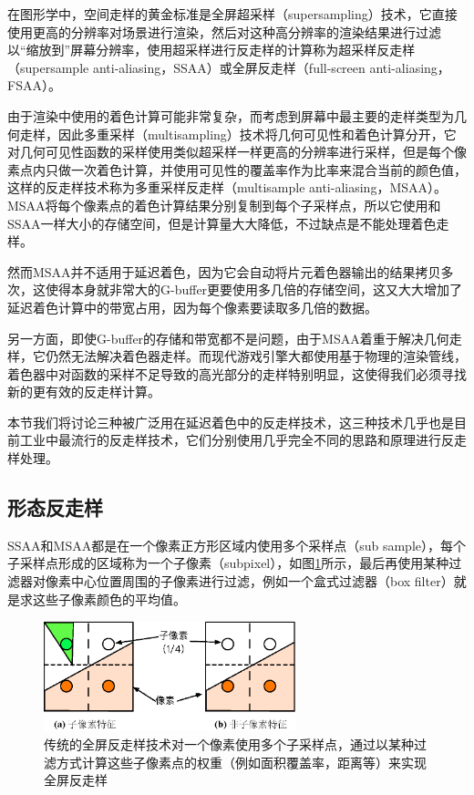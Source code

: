 在图形学中，空间走样的黄金标准是全屏超采样（supersampling）技术，它直接使用更高的分辨率对场景进行渲染，然后对这种高分辨率的渲染结果进行过滤以“缩放到”屏幕分辨率，使用超采样进行反走样的计算称为超采样反走样（supersample anti-aliasing，SSAA）或全屏反走样（full-screen anti-aliasing，FSAA）。

由于渲染中使用的着色计算可能非常复杂，而考虑到屏幕中最主要的走样类型为几何走样，因此多重采样（multisampling）技术将几何可见性和着色计算分开，它对几何可见性函数的采样使用类似超采样一样更高的分辨率进行采样，但是每个像素点内只做一次着色计算，并使用可见性的覆盖率作为比率来混合当前的颜色值，这样的反走样技术称为多重采样反走样（multisample anti-aliasing，MSAA）。MSAA将每个像素点的着色计算结果分别复制到每个子采样点，所以它使用和SSAA一样大小的存储空间，但是计算量大大降低，不过缺点是不能处理着色走样。

然而MSAA并不适用于延迟着色，因为它会自动将片元着色器输出的结果拷贝多次，这使得本身就非常大的G-buffer更要使用多几倍的存储空间，这又大大增加了延迟着色计算中的带宽占用，因为每个像素要读取多几倍的数据。

另一方面，即使G-buffer的存储和带宽都不是问题，由于MSAA着重于解决几何走样，它仍然无法解决着色器走样。而现代游戏引擎大都使用基于物理的渲染管线，着色器中对函数的采样不足导致的高光部分的走样特别明显，这使得我们必须寻找新的更有效的反走样计算。

本节我们将讨论三种被广泛用在延迟着色中的反走样技术，这三种技术几乎也是目前工业中最流行的反走样技术，它们分别使用几乎完全不同的思路和原理进行反走样处理。




\subsection{形态反走样}
SSAA和MSAA都是在一个像素正方形区域内使用多个采样点（sub sample），每个子采样点形成的区域称为一个子像素（subpixel），如图\ref{f:shade-subpixel}所示，最后再使用某种过滤器对像素中心位置周围的子像素进行过滤，例如一个盒式过滤器（box filter）就是求这些子像素颜色的平均值。

\begin{figure}
	\sidecaption
	\includegraphics[width=0.65\textwidth]{figures/shade/subpixel}
	\caption{传统的全屏反走样技术对一个像素使用多个子采样点，通过以某种过滤方式计算这些子像素点的权重（例如面积覆盖率，距离等）来实现全屏反走样}
	\label{f:shade-subpixel}
\end{figure}

